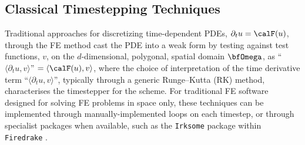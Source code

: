\subsection*{Classical Timestepping Techniques}

    Traditional approaches for discretizing time-dependent PDEs, $\partial_{t}u  =  \calF(u)$, through the FE method cast the PDE into a weak form by testing against test functions, $v$, on the $d$-dimensional, polygonal, spatial domain $\bfOmega$, as ``$\langle\partial_{t}u, v\rangle$''  $=  \langle\calF(u), v\rangle$, where the choice of interpretation of the time derivative term ``$\langle\partial_{t}u, v\rangle$'', typically through a generic Runge–Kutta (RK) method, characterises the timestepper for the scheme. For traditional FE software designed for solving FE problems in space only, these techniques can be implemented through manually-implemented loops on each timestep, or through specialist packages when available, such as the \texttt{Irksome} package within \texttt{Firedrake} \BA{[Ref]}.

    